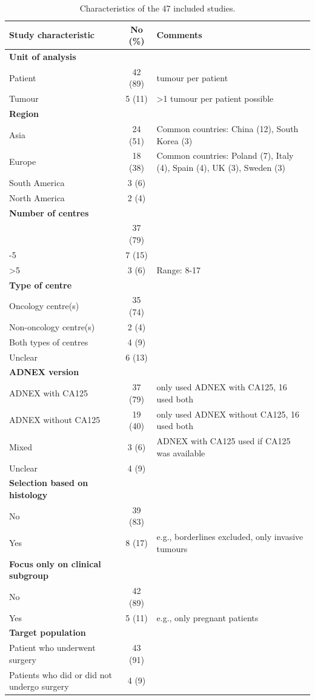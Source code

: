  \begin{table}[h!]
\footnotesize
\centering
\caption{Characteristics of the 47 included studies.}
\label{tab:1}
\begin{tabularx}{\linewidth}{l c >{\raggedright\arraybackslash}X}
\toprule
\textbf{Study characteristic} & \textbf{No (\%)} & \textbf{Comments} \\ 
\midrule
\textbf{Unit of analysis} & & \\
\quad Patient & 42 (89) & 1 tumour per patient \\
\quad Tumour & 5 (11) & >1 tumour per patient possible \\
\addlinespace
\textbf{Region} & & \\
\quad Asia & 24 (51) & Common countries: China (12), South Korea (3) \\
\quad Europe & 18 (38) & Common countries: Poland (7), Italy (4), Spain (4), UK (3), Sweden (3) \\
\quad South America & 3 (6) & \\
\quad North America & 2 (4) & \\
\addlinespace
\textbf{Number of centres} & & \\
\quad 1 & 37 (79) & \\
\quad 2-5 & 7 (15) & \\
\quad >5 & 3 (6) & Range: 8-17 \\
\addlinespace
\textbf{Type of centre} & & \\
\quad Oncology centre(s) & 35 (74) & \\
\quad Non-oncology centre(s) & 2 (4) & \\
\quad Both types of centres & 4 (9) & \\
\quad Unclear & 6 (13) & \\
\addlinespace
\textbf{ADNEX version} & & \\
\quad \gls{ADNEX} with CA125 & 37 (79) & 21 only used \gls{ADNEX} with CA125, 16 used both \\
\quad \gls{ADNEX} without CA125 & 19 (40) & 3 only used \gls{ADNEX} without CA125, 16 used both \\
\quad Mixed & 3 (6) & \gls{ADNEX} with CA125 used if CA125 was available \\
\quad  Unclear & 4 (9) & \\
\addlinespace
\textbf{Selection based on histology} & & \\
\quad No & 39 (83) & \\
\quad Yes & 8 (17) & e.g., borderlines excluded, only invasive tumours \\
\addlinespace
\textbf{Focus only on clinical subgroup} & & \\
\quad No & 42 (89) & \\
\quad Yes & 5 (11) & e.g., only pregnant patients \\
\addlinespace
\textbf{Target population} & & \\
\quad Patient who underwent surgery & 43 (91) & \\
\quad  Patients who did or did not undergo surgery & 4 (9) & \\
\bottomrule
\end{tabularx}
\end{table}


